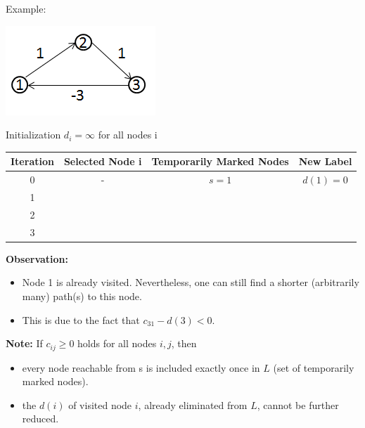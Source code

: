 \begin{enumerate}
\begin{solution}
	Example:
	\begin{center}
		\includegraphics[scale=0.7]{Uebungen/figures/Graph_A_3_2}
	\end{center}
	Initialization $d_i=\infty$ for all nodes i
	\begin{center}
			\begin{tabular}{c|c|c|c}
			Iteration&Selected Node i&Temporarily Marked Nodes&New Label\\
			\hline
			0&-&$s=1$&$d\left(1\right)=0$\\
			1&\phantom{1}&\phantom{$2$}&\phantom{$d\left(2\right)=1$}\\
			2&\phantom{2}&\phantom{$3$}&\phantom{$d\left(3\right)=2$}\\
			3&\phantom{3}&\phantom{-}&\phantom{$d\left(1\right)=-1$}\\
			\end{tabular}
		\end{center}
		\textbf{Observation:}
	\begin{itemize}
	\item Node 1 is already visited. Nevertheless, one can still find a shorter (arbitrarily many) path(s) to this node.
	\item This is due to the fact that $c_{31}-d(3)<0$.
\end{itemize}
	
	\textbf{Note:}  If $c_{ij}\geq 0$ holds for all nodes $i,j$, then
	\begin{itemize}
			\item every node reachable from s is included exactly once in $L$ (set of temporarily marked nodes).
			\item the $d(i)$ of visited node $i$, already eliminated from $L$, cannot be further reduced.
	\end{itemize}
	\end{solution}
\end{enumerate}
